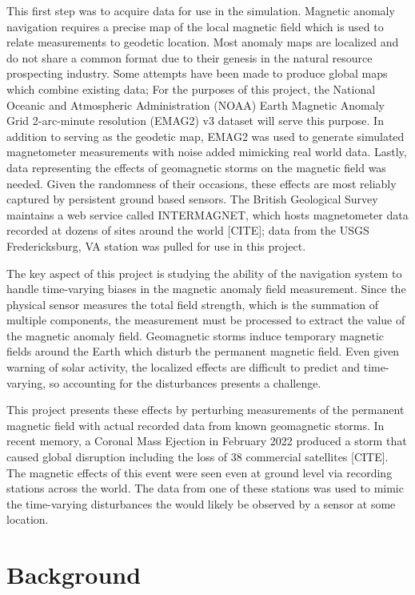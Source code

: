 \documentclass[conf]{new-aiaa}
\begin{document}
This first step was to acquire data for use in the simulation. Magnetic anomaly navigation requires a precise map of the local magnetic field which is used to relate measurements to geodetic location. Most anomaly maps are localized and do not share a common format due to their genesis in the natural resource prospecting industry. Some attempts have been made to produce global maps which combine existing data; For the purposes of this project, the National Oceanic and Atmospheric Administration (NOAA) Earth Magnetic Anomaly Grid 2-arc-minute resolution (EMAG2) v3 dataset will serve this purpose. In addition to serving as the geodetic map, EMAG2 was used to generate simulated magnetometer measurements with noise added mimicking real world data. Lastly, data representing the effects of geomagnetic storms on the magnetic field was needed. Given the randomness of their occasions, these effects are most reliably captured by persistent ground based sensors. The British Geological Survey maintains a web service called INTERMAGNET, which hosts magnetometer data recorded at dozens of sites around the world [CITE]; data from the USGS Fredericksburg, VA station was pulled for use in this project.

The key aspect of this project is studying the ability of the navigation system to handle time-varying biases in the magnetic anomaly field measurement. Since the physical sensor measures the total field strength, which is the summation of multiple components, the measurement must be processed to extract the value of the magnetic anomaly field. Geomagnetic storms induce temporary magnetic fields around the Earth which disturb the permanent magnetic field. Even given warning of solar activity, the localized effects are difficult to predict and time-varying, so accounting for the disturbances presents a challenge.

This project presents these effects by perturbing measurements of the permanent magnetic field with actual recorded data from known geomagnetic storms. In recent memory, a Coronal Mass Ejection in February 2022 produced a storm that caused global disruption including the loss of 38 commercial satellites [CITE]. The magnetic effects of this event were seen even at ground level via recording stations across the world. The data from one of these stations was used to mimic the time-varying disturbances the would likely be observed by a sensor at some location.  

\section{Background} %
\end{document}
